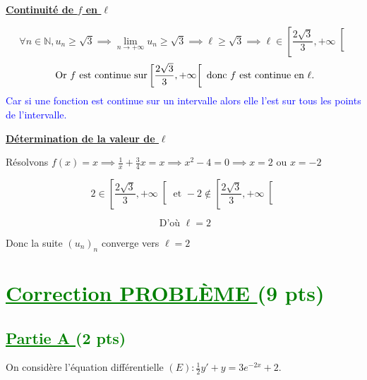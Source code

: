 \documentclass[12pt]{article}
\begin{document}
\begin{enumerate}
\textbf{\underline{Continuité de \( f \) en \( \ell \)}}

\[
\forall n\in \mathbb{N}, u_{n} \geq\sqrt{3} \implies \lim_{n \to +\infty}u_{n}\geq\sqrt{3} \implies \ell  \geq\sqrt{3} \implies \ell \in \left[ \frac{2\sqrt{3}}{3}, +\infty\right[ 
\]
\[
\text{ Or  \( f \) est continue sur} \left[ \frac{2\sqrt{3}}{3}, +\infty\right[ 
\text{ donc \( f \) est continue en } \ell .
\]
\textcolor{blue}{Car si une fonction est continue sur un intervalle alors elle l'est sur tous les points de l'intervalle.}

\textbf{\underline{Détermination de la valeur de \( \ell \)}}

Résolvons  \(f(x) = x\implies \frac{1}{x}+\frac{3}{4}x=x\implies x^{2}-4=0 \implies x=2 \text{ ou } x=-2\)

\[
2 \in \left[ \frac{2\sqrt{3}}{3}, +\infty\right[  \text{ et } -2 \notin \left[ \frac{2\sqrt{3}}{3}, +\infty\right[
\]

\[
\text{ D'où }  \ell =2
\]

Donc la suite \( (u_{n})_{n} \) converge vers \( \ell =2 \)

\end{enumerate}
\section*{\textcolor{green}{\underline{Correction PROBLÈME } (9 pts) }}
\subsection*{\textcolor{green}{\underline{Partie A }(2 pts)}}
On considère l'équation différentielle \( (E):\frac{1}{2}y'+y=3e^{-2x}+2 \).
\end{document}
